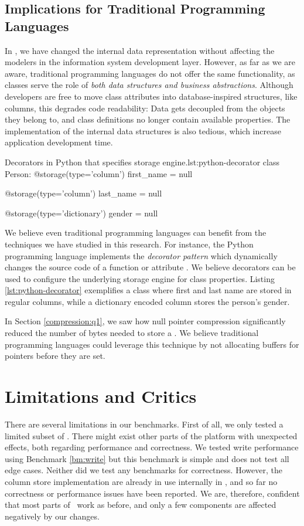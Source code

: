 \subsection{Implications for Traditional Programming Languages}
\label{sub:Implications for Traditional Programming Languages}
In \mde, we have changed the internal data representation without affecting the modelers in the information system development layer. However, as far as we are aware, traditional programming languages do not offer the same functionality, as classes serve the role of \textit{both data structures and business abstractions}. Although developers are free to move class attributes into database-inspired structures, like columns, this degrades code readability: Data gets decoupled from the objects they belong to, and class definitions no longer contain available properties. The implementation of the internal data structures is also tedious, which increase application development time.

\begin{pythoncode}{Decorators in Python that specifies storage engine.}{lst:python-decorator}
class Person:
    @storage(type='column')
    first_name = null

    @storage(type='column')
    last_name = null

    @storage(type='dictionary')
    gender = null
\end{pythoncode}
We believe even traditional programming languages can benefit from the techniques we have studied in this research. For instance, the Python programming language implements the \textit{decorator pattern} which dynamically changes the source code of a function or attribute \cite{noauthor_undated-aq}. We believe decorators can be used to configure the underlying storage engine for class properties. Listing \ref{lst:python-decorator} exemplifies a  class where first and last name are stored in regular columns, while a dictionary encoded column stores the person's gender.

In Section \ref{compression:q1}, we saw how null pointer compression significantly reduced the number of bytes needed to store a . We believe traditional programming languages could leverage this technique by not allocating buffers for pointers before they are set.

\section{Limitations and Critics}
\label{sec:Limitations and Critics}
There are several limitations in our benchmarks. First of all, we only tested a limited subset of \gap. There might exist other parts of the platform with unexpected effects, both regarding performance and correctness. We tested write performance using Benchmark \ref{bm:write} but this benchmark is simple and does not test all edge cases. Neither did we test any benchmarks for correctness. However, the column store implementation are already in use internally in \genus, and so far no correctness or performance issues have been reported. We are, therefore, confident that most parts of \gap~work as before, and only a few components are affected negatively by our changes.


